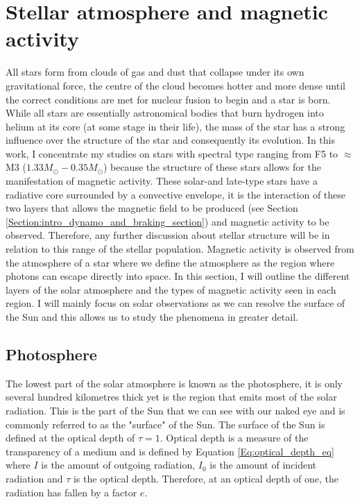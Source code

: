\section{Stellar atmosphere and magnetic activity}
\label{Section:intro_stellar_structure}

All stars form from clouds of gas and dust that collapse under its own gravitational force, the centre of the cloud becomes hotter and more dense until the correct conditions are met for nuclear fusion to begin and a star is born. While all stars are essentially astronomical bodies that burn hydrogen into helium at its core (at some stage in their life), the mass of the star has a strong influence over the structure of the star and consequently its evolution. In this work, I concentrate my studies on stars with spectral type ranging from F5 to $\approx$ M3 ($1.33 M_{\odot} - 0.35 M_{\odot}$) because the structure of these stars allows for the manifestation of magnetic activity. These solar-and late-type stars have a radiative core surrounded by a convective envelope, it is the interaction of these two layers that allows the magnetic field to be produced (see Section \ref{Section:intro_dynamo_and_braking_section}) and magnetic activity to be observed. Therefore, any further discussion about stellar structure will be in relation to this range of the stellar population. Magnetic activity is observed from the atmosphere of a star where we define the atmosphere as the region where photons can escape directly into space. In this section, I will outline the different layers of the solar atmosphere and the types of magnetic activity seen in each region. I will mainly focus on solar observations as we can resolve the surface of the Sun and this allows us to study the phenomena in greater detail.

\subsection{Photosphere}

The lowest part of the solar atmosphere is known as the photosphere, it is only several hundred kilometres thick yet is the region that emits most of the solar radiation. This is the part of the Sun that we can see with our naked eye and is commonly referred to as the "surface" of the Sun. The surface of the Sun is defined at the optical depth of $\tau = 1$. Optical depth is a measure of the transparency of a medium and is defined by Equation \ref{Eq:optical_depth_eq} where $I$ is the amount of outgoing radiation, $I_{0}$ is the amount of incident radiation and $\tau$ is the optical depth. Therefore, at an optical depth of one, the radiation has fallen by a factor $e$.

